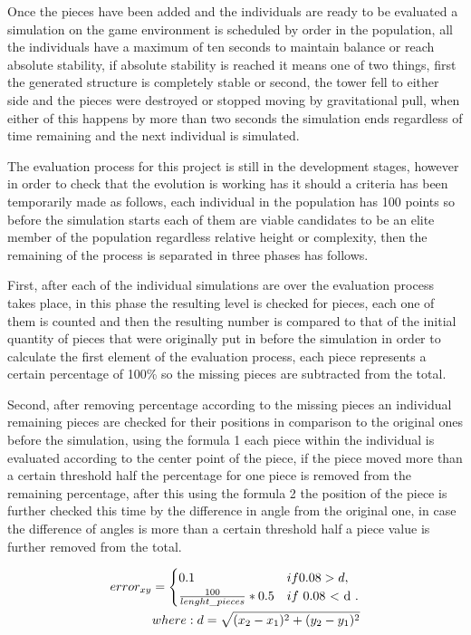 \documentclass[graybox]{svmult}
\begin{document}
Once the pieces have been added and the individuals are ready to be evaluated a simulation on the game environment is scheduled by order in the population, all the individuals have a maximum of ten seconds to maintain balance or reach absolute stability, if absolute stability is reached it means one of two things, first the generated structure is completely stable or second, the tower fell to either side and the pieces were destroyed or stopped moving by gravitational pull, when either of this happens by more than two seconds the simulation ends regardless of time remaining and the next individual is simulated.

The evaluation process for this project is still in the development stages, however in order to check that the evolution is working has it should a criteria has been temporarily made as follows, each individual in the population has 100 points so before the simulation starts each of them are viable candidates to be an elite member of the population regardless relative height or complexity, then the remaining of the process is separated in three phases has follows.

First, after each of the individual simulations are over the evaluation process takes place, in this phase the resulting level is checked for pieces, each one of them is counted and then the resulting number is compared to that of the initial quantity of pieces that were originally put in before the simulation in order to calculate the first element of the evaluation process, each piece represents a certain percentage of 100\% so the missing pieces are subtracted from the total.

Second, after removing percentage according to the missing pieces an individual remaining pieces are checked for their positions in comparison to the original ones before the simulation, using the formula 1 each piece within the individual is evaluated according to the center point of the piece, if the piece moved more than a certain threshold half the percentage for one piece is removed from the remaining percentage, after this using the formula 2 the position of the piece is further checked this time by the difference in angle from the original one, in case the difference of angles is more than a certain threshold half a piece value is further removed from the total.

\begin{equation}
    \begin{aligned}
        error_{xy} =
            \begin{cases}
                0.1 & if 0.08 > d, \\
                \frac{100}{lenght\_pieces} * 0.5 & if $ 0.08 < d $.
            \end{cases} \\
        where: d=\sqrt{(x_2 - x_1)^2 + (y_2 - y_1)^2}    
    \end{aligned}
\end{equation}
\end{document}
